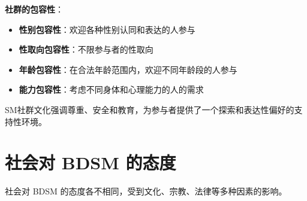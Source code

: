 \documentclass[12pt,UTF8]{ctexbook}
\begin{document}
\textbf{社群的包容性}：
  \begin{itemize}
  \item \textbf{性别包容性}：欢迎各种性别认同和表达的人参与
  \item \textbf{性取向包容性}：不限参与者的性取向
  \item \textbf{年龄包容性}：在合法年龄范围内，欢迎不同年龄段的人参与
  \item \textbf{能力包容性}：考虑不同身体和心理能力的人的需求
  \end{itemize}

SM社群文化强调尊重、安全和教育，为参与者提供了一个探索和表达性偏好的支持性环境。

\section{社会对 BDSM 的态度}

社会对 BDSM 的态度各不相同，受到文化、宗教、法律等多种因素的影响。
\end{document}
